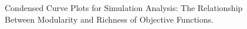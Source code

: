  \begin{figure}[!ht]
	\begin{center}
		\caption{Condensed Curve Plots for Simulation Analysis: The Relationship Between Modularity and Richness of Objective Functions.}
		\label{figure-FBA-results}
	\end{center}
\end{figure}